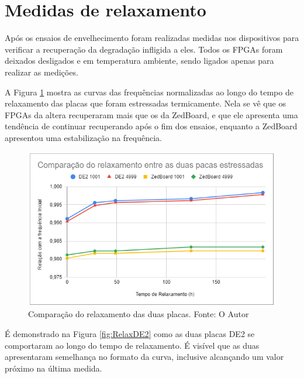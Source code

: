 \section{Medidas de relaxamento}
\label{sec:ResRelax}

Após os ensaios de envelhecimento foram realizadas medidas nos dispositivos para verificar a recuperação da degradação infligida a eles. Todos os FPGAs foram deixados desligados e em temperatura ambiente, sendo ligados apenas para realizar as medições.

A Figura \ref{fig:RelaxEstressadas} mostra as curvas das frequências normalizadas ao longo do tempo de relaxamento das placas que foram estressadas termicamente. Nela se vê que os FPGAs da altera recuperaram mais que os da ZedBoard, e que ele apresenta uma tendência de continuar recuperando após o fim dos ensaios, enquanto a ZedBoard apresentou uma estabilização na frequência.

\begin{figure}[H]
    \centering
    \includegraphics[scale=0.75]{figures/Resultados/RelaxEstressadas}
    \caption{Comparação do relaxamento das duas placas. Fonte: O Autor}
    \label{fig:RelaxEstressadas}
\end{figure}

É demonstrado na Figura \ref{fig:RelaxDE2} como as duas placas DE2 se comportaram ao longo do tempo de relaxamento. É visível que as duas apresentaram semelhança no formato da curva, inclusive alcançando um valor próximo na última medida. 

